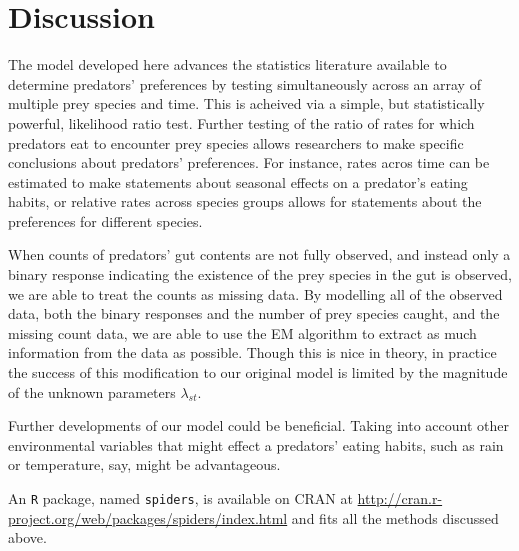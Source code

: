 \section{Discussion}
\label{sec:discussion}

The model developed here advances the statistics literature available to determine predators' preferences by testing simultaneously across an array of multiple prey species and time.  This is acheived via a simple, but statistically powerful, likelihood ratio test.  Further testing of the ratio of rates for which predators eat to encounter prey species allows researchers to make specific conclusions about predators' preferences.  For instance, rates acros time can be estimated to make statements about seasonal effects on a predator's eating habits, or relative rates across species groups allows for statements about the preferences for different species.

When counts of predators' gut contents are not fully observed, and instead only a binary response indicating the existence of the prey species in the gut is observed, we are able to treat the counts as missing data.  By modelling all of the observed data, both the binary responses and the number of prey species caught, and the missing count data, we are able to use the EM algorithm to extract as much information from the data as possible.  Though this is nice in theory, in practice the success of this modification to our original model is limited by the magnitude of the unknown parameters $\lambda_{st}$.  

Further developments of our model could be beneficial.  Taking into account other environmental variables that might effect a predators' eating habits, such as rain or temperature, say, might be advantageous.  

An \texttt{R} package, named \texttt{spiders}, is available on CRAN at \url{http://cran.r-project.org/web/packages/spiders/index.html} and fits all the methods discussed above.  

